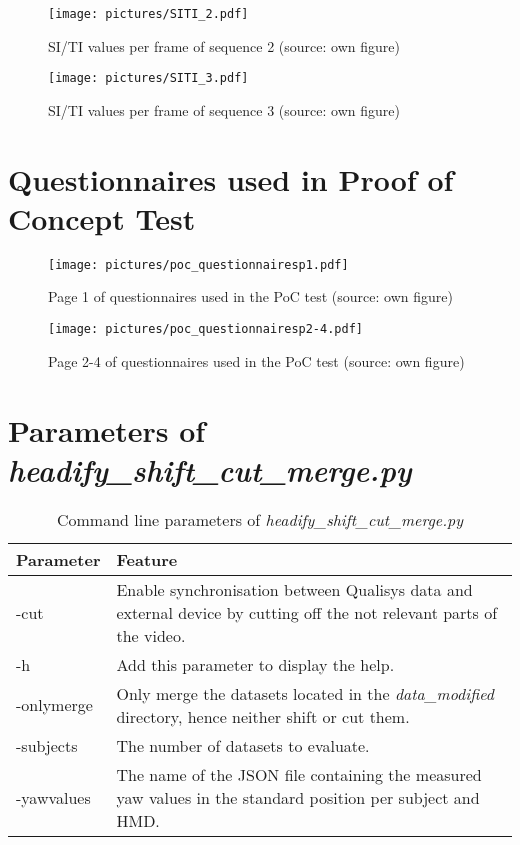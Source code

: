 \begin{figure}[!h]
	\centering
	\texttt{[image: pictures/SITI\_2.pdf]}
	\caption{SI/TI values per frame of sequence 2 (source: own figure)}
	\label{picture:siti_2}
\end{figure}

\begin{figure}[!h]
	\centering
	\texttt{[image: pictures/SITI\_3.pdf]}
	\caption{SI/TI values per frame of sequence 3 (source: own figure)}
	\label{picture:siti_3}
\end{figure}

\cleardoublepage

\section{Questionnaires used in Proof of Concept Test} \label{appendix:questionnaires}
\begin{figure}[!h]
	\centering
	\texttt{[image: pictures/poc\_questionnairesp1.pdf]}
	\caption{Page 1 of questionnaires used in the PoC test (source: own figure)}
	\label{picture:poc_questionnairesp1}
\end{figure}

\cleardoublepage

\begin{figure}[!h]
	\centering
	\texttt{[image: pictures/poc\_questionnairesp2-4.pdf]}
	\caption{Page 2-4 of questionnaires used in the PoC test (source: own figure)}
	\label{picture:poc_questionnairesp2-4}
\end{figure}


\section{Parameters of \textit{headify\_shift\_cut\_merge.py}} \label{appendix:headify_shiftcutmerge}

\begin{table}[!h]
	\centering
	\begin{tabular}{|>{\RaggedRight}p{3cm}|>{\RaggedRight}p{10cm}|}\hline
		\rowcolor[gray] {.6} \textbf{Parameter} & \textbf{Feature} \\ \hline
		-cut & Enable synchronisation between Qualisys data and external device by cutting off the not relevant parts of the video.
		 \\ \hline
		 -h & Add this parameter to display the help. \\ \hline
		-onlymerge & Only merge the datasets located in the \textit{data\_modified} directory, hence neither shift or cut them.
		 \\ \hline
		-subjects & The number of datasets to evaluate. \\ \hline
		-yawvalues & The name of the JSON file containing the measured yaw values in the standard position per subject and HMD.
		 \\ \hline
	\end{tabular}
	\caption{Command line parameters of \textit{headify\_shift\_cut\_merge.py}}
	\label{table:headify_shiftcutmerge}
\end{table}


